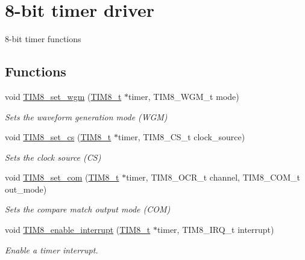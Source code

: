 \hypertarget{group___t_i_m8}{}\section{8-\/bit timer driver}
\label{group___t_i_m8}


8-\/bit timer functions  


\subsection*{Functions}
\begin{DoxyCompactItemize}
\item 
void \mbox{\hyperlink{group___t_i_m8_gac8d83739b9bf78c66d16de8d9a5f3a4e}{T\+I\+M8\+\_\+set\+\_\+wgm}} (\mbox{\hyperlink{struct_t_i_m8__t}{T\+I\+M8\+\_\+t}} $\ast$timer, T\+I\+M8\+\_\+\+W\+G\+M\+\_\+t mode)
\begin{DoxyCompactList}\small\item\em Sets the waveform generation mode (W\+GM) \end{DoxyCompactList}\item 
void \mbox{\hyperlink{group___t_i_m8_gaa68ae4ef1d87bbb8e3b2696de1a4740c}{T\+I\+M8\+\_\+set\+\_\+cs}} (\mbox{\hyperlink{struct_t_i_m8__t}{T\+I\+M8\+\_\+t}} $\ast$timer, T\+I\+M8\+\_\+\+C\+S\+\_\+t clock\+\_\+source)
\begin{DoxyCompactList}\small\item\em Sets the clock source (CS) \end{DoxyCompactList}\item 
void \mbox{\hyperlink{group___t_i_m8_ga9fc611aa062837337cdfd8a2d3953394}{T\+I\+M8\+\_\+set\+\_\+com}} (\mbox{\hyperlink{struct_t_i_m8__t}{T\+I\+M8\+\_\+t}} $\ast$timer, T\+I\+M8\+\_\+\+O\+C\+R\+\_\+t channel, T\+I\+M8\+\_\+\+C\+O\+M\+\_\+t out\+\_\+mode)
\begin{DoxyCompactList}\small\item\em Sets the compare match output mode (C\+OM) \end{DoxyCompactList}\item 
void \mbox{\hyperlink{group___t_i_m8_ga8cd7287239b4feb3817a2f4210584ead}{T\+I\+M8\+\_\+enable\+\_\+interrupt}} (\mbox{\hyperlink{struct_t_i_m8__t}{T\+I\+M8\+\_\+t}} $\ast$timer, T\+I\+M8\+\_\+\+I\+R\+Q\+\_\+t interrupt)
\begin{DoxyCompactList}\small\item\em Enable a timer interrupt. \end{DoxyCompactList}\item 

\end{DoxyCompactItemize}
